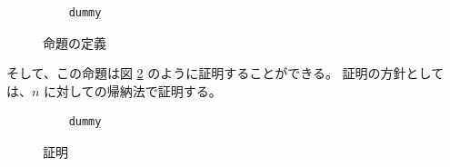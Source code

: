 \begin{figure}[tp]
  \begin{lstlisting}
    dummy
  \end{lstlisting}
  \label{code:overview:fact-spec}
  \caption{命題の定義}
\end{figure}

そして、この命題は図 \ref{code:overview:fact-proof} のように証明することができる。
証明の方針としては、$n$ に対しての帰納法で証明する。

\begin{figure}[tp]
  \begin{lstlisting}
    dummy
  \end{lstlisting}
  \label{code:overview:fact-proof}
  \caption{証明}
\end{figure}
